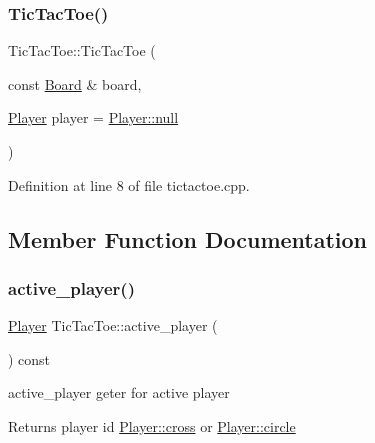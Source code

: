 \subsubsection{\texorpdfstring{Tic\+Tac\+Toe()}{TicTacToe()}\hspace{0.1cm}{\footnotesize\ttfamily [2/2]}}
{\footnotesize\ttfamily Tic\+Tac\+Toe\+::\+Tic\+Tac\+Toe (\begin{DoxyParamCaption}\item[{const \hyperlink{common__defs_8h_a0dc5e1c0d1c3d4b1e210c805de5ca27b}{Board} \&}]{board,  }\item[{\hyperlink{common__defs_8h_a9c8780378078e51e7c9041cbac392db9}{Player}}]{player = {\ttfamily \hyperlink{common__defs_8h_a9c8780378078e51e7c9041cbac392db9a37a6259cc0c1dae299a7866489dff0bd}{Player\+::null}} }\end{DoxyParamCaption})}



Definition at line 8 of file tictactoe.\+cpp.



\subsection{Member Function Documentation}
\mbox{\label{class_tic_tac_toe_af58c3728beedc8d250927f1f07c03dee}} 
\subsubsection{\texorpdfstring{active\+\_\+player()}{active\_player()}}
{\footnotesize\ttfamily \hyperlink{common__defs_8h_a9c8780378078e51e7c9041cbac392db9}{Player} Tic\+Tac\+Toe\+::active\+\_\+player (\begin{DoxyParamCaption}{ }\end{DoxyParamCaption}) const\hspace{0.3cm}{\ttfamily [inline]}}



active\+\_\+player geter for active player 

\begin{DoxyReturn}{Returns}
player id \hyperlink{common__defs_8h_a9c8780378078e51e7c9041cbac392db9a22aadb26447d87b550b155a4d764fad0}{Player\+::cross} or \hyperlink{common__defs_8h_a9c8780378078e51e7c9041cbac392db9a9b6ddeba5b33e577c07c35d8505c6072}{Player\+::circle} 
\end{DoxyReturn}


